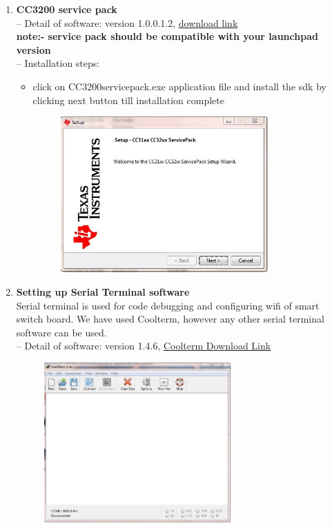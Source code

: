 \documentclass[a4paper,12pt,oneside]{book}
\begin{document}
\begin{enumerate}
\begin{itemize}
\begin{figure}[h]
	 \end{figure}
\end{itemize}
\newpage
\item\textbf{ CC3200 service pack} \\
-- Detail of software: version 1.0.0.1.2, \href{http://www.ti.com}{download link}\\
   \textbf{note:- service pack should be compatible with your launchpad version}\\
-- Installation steps:
\begin{itemize}
	\item click on CC3200servicepack.exe application file and install the sdk by clicking next button till installation complete
	\begin{figure}[h]
		\hspace{2cm}
		\includegraphics[width=300px]{service1}
	\end{figure}
\end{itemize}
\newpage
\item\textbf{Setting up Serial Terminal software} \\
Serial terminal is used for code debugging and configuring wifi of smart switch board. We have used Coolterm, however any other serial terminal software can be used.  \\
-- Detail of software: version 1.4.6, \href{http://www.coolterm.com}{Coolterm Download Link}\\
	\begin{figure}[h]
		\hspace{2cm}
		\includegraphics[width=270px]{inst16}

\end{figure}
\end{enumerate}
\end{document}
